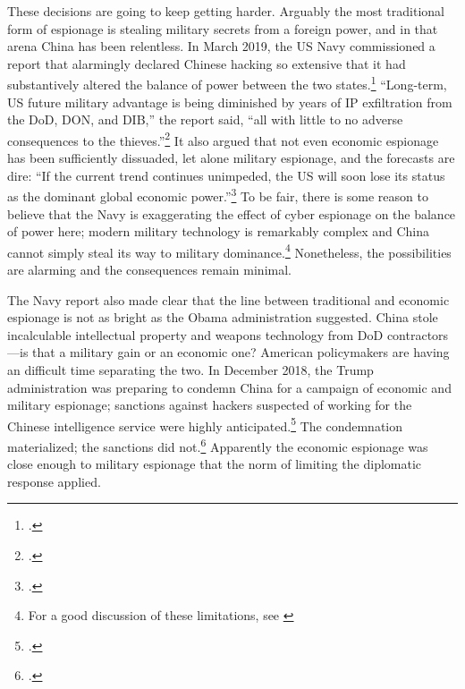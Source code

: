 \documentclass[11pt]{memoir}
\begin{document}
\begin{refsegment}
These decisions are going to keep getting harder. Arguably the most traditional form of espionage is stealing military secrets from a foreign power, and in that arena China has been relentless. In March 2019, the US Navy commissioned a report that alarmingly declared Chinese hacking so extensive that it had substantively altered the balance of power between the two states.\footcite{lubold_navy_2019} ``Long-term, US future military advantage is being diminished by years of IP exfiltration from the DoD, DON, and DIB,'' the report said, ``all with little to no adverse consequences to the thieves.''\footcite[p.~6]{bayer_cybersecurity_2019} It also argued that not even economic espionage has been sufficiently dissuaded, let alone military espionage, and the forecasts are dire: ``If the current trend continues unimpeded, the US will soon lose its status as the dominant global economic power.''\footcite[p.~5]{bayer_cybersecurity_2019} To be fair, there is some reason to believe that the Navy is exaggerating the effect of cyber espionage on the balance of power here; modern military technology is remarkably complex and China cannot simply steal its way to military dominance.\footnote{For a good discussion of these limitations, see \cite{gilli_why_2019}} Nonetheless, the possibilities are alarming and the consequences remain minimal.

The Navy report also made clear that the line between traditional and economic espionage is not as bright as the Obama administration suggested. China stole incalculable intellectual property and weapons technology from DoD contractors---is that a military gain or an economic one? American policymakers are having an difficult time separating the two. In December 2018, the Trump administration was preparing to condemn China for a campaign of economic and military espionage; sanctions against hackers suspected of working for the Chinese intelligence service were highly anticipated.\footcite{nakashima_trump_2018-1} The condemnation materialized; the sanctions did not.\footcite{barfield_new_2019} Apparently the economic espionage was close enough to military espionage that the norm of limiting the diplomatic response applied.


\end{refsegment}
\end{document}
